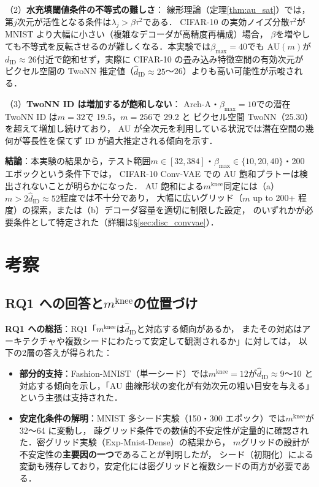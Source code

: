 \documentclass[11pt,a4paper]{jsarticle}
\newcommand{\mknee}{m^{\mathrm{knee}}}
\begin{document}
（2）\textbf{水充填閾値条件の不等式の難しさ}：
線形理論（定理\ref{thm:au_sat}）では，第$j$次元が活性となる条件は$\lambda_j > \beta \tau^2$である．
CIFAR-10 の実効ノイズ分散$\tau^2$が MNIST より大幅に小さい（複雑なデコーダが高精度再構成）場合，
$\beta$を増やしても不等式を反転させるのが難しくなる．本実験では$\beta_{\max}=40$でも
AU$(m)$が$d_{\mathrm{ID}} \approx 26$付近で飽和せず，実際に CIFAR-10 の畳み込み特徴空間の有効次元が
ピクセル空間の TwoNN 推定値（$\hat{d}_{\mathrm{ID}} \approx 25$〜26）よりも高い可能性が示唆される．

（3）\textbf{TwoNN ID は増加するが飽和しない}：
Arch-A・$\beta_{\max}=10$での潜在 TwoNN ID は$m=32$で 19.5，$m=256$で 29.2 と
ピクセル空間 TwoNN（25.30）を超えて増加し続けており，
AU が全次元を利用している状況では潜在空間の幾何が等長性を保てず ID が過大推定される傾向を示す．

\textbf{結論}：本実験の結果から，テスト範囲$m \in [32, 384]$・$\beta_{\max} \in \{10, 20, 40\}$・200 エポックという条件下では，
CIFAR-10 Conv-VAE での AU 飽和プラトーは検出されないことが明らかになった．
AU 飽和による$\mknee$同定には（a）$m > 2\hat{d}_{\mathrm{ID}} \approx 52$程度では不十分であり，
大幅に広いグリッド（$m$ up to 200+ 程度）の探索，または（b）デコーダ容量を適切に制限した設定，
のいずれかが必要条件として特定された（詳細は§\ref{sec:disc_convvae}）．

\section{考察}\label{sec:discussion}

\subsection{RQ1 への回答と$\mknee$の位置づけ}\label{sec:disc_mknee}

\textbf{RQ1 への総括}：RQ1「$\mknee$は$\hat{d}_\mathrm{ID}$と対応する傾向があるか，
またその対応はアーキテクチャや複数シードにわたって安定して観測されるか」に対しては，
以下の2層の答えが得られた：

\begin{itemize}
  \item \textbf{部分的支持}：Fashion-MNIST（単一シード）では$\mknee = 12$が$\hat{d}_\mathrm{ID} \approx 9$〜10
        と対応する傾向を示し，「AU 曲線形状の変化が有効次元の粗い目安を与える」という主張は支持された．
  \item \textbf{安定化条件の解明}：MNIST 多シード実験（150・300 エポック）では$\mknee$が 32〜64 に変動し，
        疎グリッド条件での数値的不安定性が定量的に確認された．密グリッド実験（Exp-Mnist-Dense）の結果から，
        $m$グリッドの設計が不安定性の\textbf{主要因の一つ}であることが判明したが，
        シード（初期化）による変動も残存しており，安定化には密グリッドと複数シードの両方が必要である．
\end{itemize}
\end{document}
